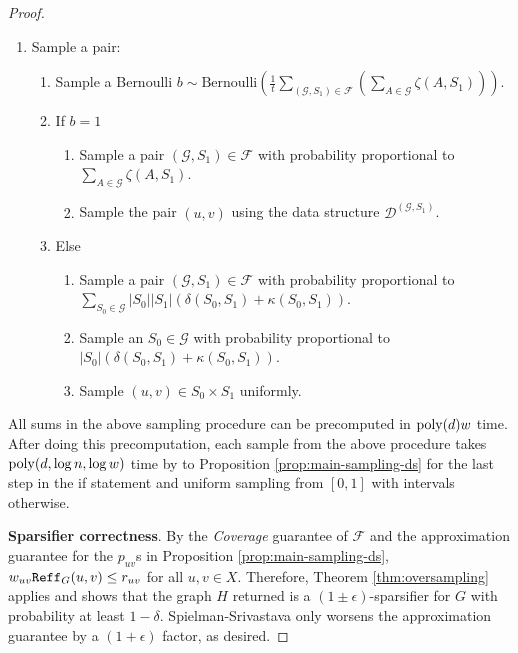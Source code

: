 \begin{proof}
\begin{enumerate}
    \item Sample a pair:
    \begin{enumerate}
        \item Sample a Bernoulli $b\sim \text{Bernoulli}\left(\frac{1}{t}\sum_{(\mathcal G,S_1)\in \mathcal F} \left(\sum_{A\in \mathcal G} \zeta(A,S_1)\right)\right)$.
        \item If $b = 1$
        \begin{enumerate}
            \item Sample a pair $(\mathcal G,S_1)\in \mathcal F$ with probability proportional to $\sum_{A\in \mathcal G} \zeta(A,S_1)$.
            \item Sample the pair $(u,v)$ using the data structure $\mathcal D^{(\mathcal G,S_1)}$.
        \end{enumerate}
        \item Else
        \begin{enumerate}
            \item Sample a pair $(\mathcal G,S_1)\in \mathcal F$ with probability proportional to $\sum_{S_0\in \mathcal G} |S_0||S_1|(\delta(S_0,S_1) + \kappa(S_0,S_1))$.
            \item Sample an $S_0\in \mathcal G$ with probability proportional to $|S_0|(\delta(S_0,S_1) + \kappa(S_0,S_1))$.
            \item Sample $(u,v)\in S_0\times S_1$ uniformly.
        \end{enumerate}
    \end{enumerate}
\end{enumerate}

All sums in the above sampling procedure can be precomputed in $\mathrm{poly}(d) w$ time. After doing this precomputation, each sample from the above procedure takes $\mathrm{poly}(d,\log n,\log w)$ time by to Proposition \ref{prop:main-sampling-ds} for the last step in the if statement and uniform sampling from $[0,1]$ with intervals otherwise.

\textbf{Sparsifier correctness}. By the \emph{Coverage} guarantee of $\mathcal F$ and the approximation guarantee for the $p_{uv}$s in Proposition \ref{prop:main-sampling-ds}, $w_{uv}\mathtt{Reff}_G(u,v)\le r_{uv}$ for all $u,v\in X$. Therefore, Theorem \ref{thm:oversampling} applies and shows that the graph $H$ returned is a $(1\pm\epsilon)$-sparsifier for $G$ with probability at least $1 - \delta$. Spielman-Srivastava only worsens the approximation guarantee by a $(1+\epsilon)$ factor, as desired.


\end{proof}
